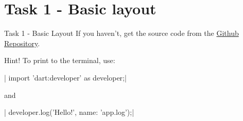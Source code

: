 \section{Task 1 - Basic layout}

\begin{frame}{Task 1 - Basic Layout}
    If you haven't, get the source code from the \href{https://github.com/NEEECFEUP/WS-App-Development/}{Github Repository}.

    \begin{block}{Hint!}
        To print to the terminal, use:
        
        | import 'dart:developer' as developer;|

        and

        | developer.log('Hello!', name: 'app.log');|
    \end{block}
\end{frame}